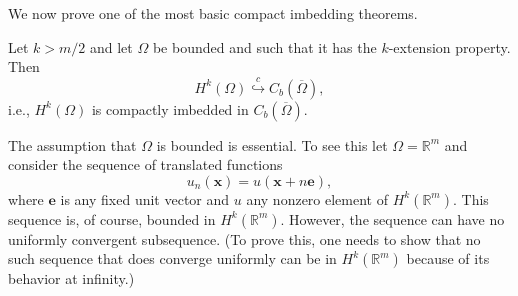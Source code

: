 \begingroup
{}
\renewcommand{\endProof}{\par\nobreak\hfill$\blacksquare$\par\vspace{0.1cm}}
\endgroup

We now prove one of the most basic compact imbedding theorems.

\begin{Theorem}
\label{thm:sobolev-continuous-target-compact-embedding}
Let $k>m/2$ and let $\Omega$ be bounded and such that it has the $k$-extension property. Then\[H^k(\Omega)\overset{c}{\hookrightarrow}C_b(\overline\Omega),\]i.e., $H^k(\Omega)$ is compactly imbedded in $C_b(\overline\Omega)$.
\end{Theorem}


\begin{Example}
\label{ex:unbounded-domain-translated-functions-noncompactness}
The assumption that $\Omega$ is bounded is essential. To see this let $\Omega=\mathbb{R}^m$ and consider the sequence of translated functions\[u_n(\bm{x})=u(\bm{x}+n\bm{e}),\]where $\bm{e}$ is any fixed unit vector and $u$ any nonzero element of $H^k(\mathbb{R}^m)$. This sequence is, of course, bounded in $H^k(\mathbb{R}^m)$. However, the sequence can have no uniformly convergent subsequence. (To prove this, one needs to show that no such sequence that does converge uniformly can be in $H^k(\mathbb{R}^m)$ because of its behavior at infinity.)
\end{Example}
